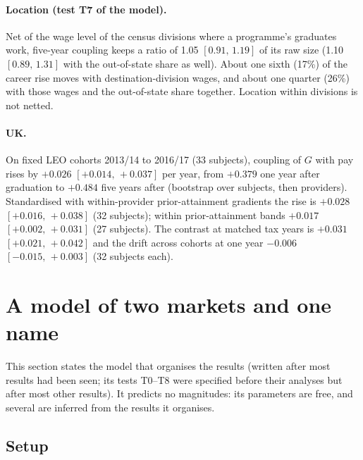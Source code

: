 \documentclass[11pt]{article}
\newcommand{\ci}[2]{$[#1,\allowbreak\,#2]$}
\begin{document}
\paragraph{Location (test T7 of the model).} Net of the wage level of the census divisions where a programme's
graduates work, five-year coupling keeps a ratio of 1.05 \ci{0.91}{1.19} of its raw size (1.10 \ci{0.89}{1.31} with the
out-of-state share as well). About one sixth (17\%) of the career rise moves with destination-division wages, and
about one quarter (26\%) with those wages and the out-of-state share together. Location within divisions is not
netted.

\paragraph{UK.} On fixed LEO cohorts 2013/14 to 2016/17 (33 subjects), coupling of $G$ with pay rises by
$+0.026$ \ci{+0.014}{+0.037} per year, from $+0.379$ one year after graduation to $+0.484$ five years after (bootstrap
over subjects, then providers). Standardised with within-provider prior-attainment gradients the rise is $+0.028$
\ci{+0.016}{+0.038} (32 subjects); within prior-attainment bands $+0.017$ \ci{+0.002}{+0.031} (27 subjects). The
contrast at matched tax years is $+0.031$ \ci{+0.021}{+0.042} and the drift across cohorts at one year $-0.006$
\ci{-0.015}{+0.003} (32 subjects each).

\section{A model of two markets and one name}\label{sec:si-model}

This section states the model that organises the results (written after most results had been seen; its tests
T0--T8 were specified before their analyses but after most other results). It predicts no magnitudes: its
parameters are free, and several are inferred from the results it organises.

\subsection{Setup}
\end{document}
